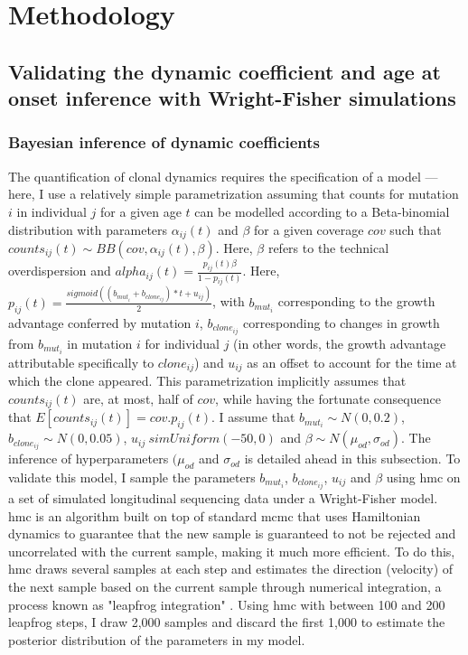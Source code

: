 \section{Methodology}

\subsection{Validating the dynamic coefficient and age at onset inference with Wright-Fisher simulations}

\subsubsection{Bayesian inference of dynamic coefficients}

The quantification of clonal dynamics requires the specification of a model --- here, I use a relatively simple parametrization assuming that counts for mutation $i$ in individual $j$ for a given age $t$ can be modelled according to a Beta-binomial distribution with parameters $\alpha_{ij}(t)$ and $\beta$ for a given coverage $cov$ such that $counts_{ij}(t) \sim BB(cov,\alpha_{ij}(t),\beta)$. Here, $\beta$ refers to the technical overdispersion and $alpha_{ij}(t) = \frac{p_{ij}(t)\beta}{1-p_{ij}(t)}$. Here, $p_{ij}(t) = \frac{sigmoid((b_{mut_i} + b_{clone_{ij}}) * t + u_{ij})}{2}$, with $b_{mut_i}$ corresponding to the growth advantage conferred by mutation $i$, $b_{clone_{ij}}$ corresponding to changes in growth from $b_{mut_i}$ in mutation $i$ for individual $j$ (in other words, the growth advantage attributable specifically to $clone_{ij}$) and $u_{ij}$ as an offset to account for the time at which the clone appeared. This parametrization implicitly assumes that $counts_{ij}(t)$ are, at most, half of $cov$, while having the fortunate consequence that $E[counts_{ij}(t)] = cov.p_{ij}(t)$. I assume that $b_{mut_i} \sim N(0,0.2)$, $b_{clone_{ij}} \sim N(0,0.05)$, $u_{ij} \ sim Uniform(-50,0)$ and $\beta \sim N(\mu_{od},\sigma_{od})$. The inference of hyperparameters $(\mu_{od}$ and $\sigma_{od}$ is detailed ahead in this subsection. To validate this model, I sample the parameters $b_{mut_i}$, $b_{clone_{ij}}$, $u_{ij}$ and $\beta$ using \ac{hmc} on a set of simulated longitudinal sequencing data under a Wright-Fisher model. \Ac{hmc} is an algorithm built on top of standard \ac{mcmc} that uses Hamiltonian dynamics to guarantee that the new sample is guaranteed to not be rejected and uncorrelated with the current sample, making it much more efficient. To do this, \ac{hmc} draws several samples at each step and estimates the direction (velocity) of the next sample based on the current sample through numerical integration, a process known as "leapfrog integration" \cite{Neal2011-lj}. Using \ac{hmc} with between 100 and 200 leapfrog steps, I draw 2,000 samples and discard the first 1,000 to estimate the posterior distribution of the parameters in my model.

